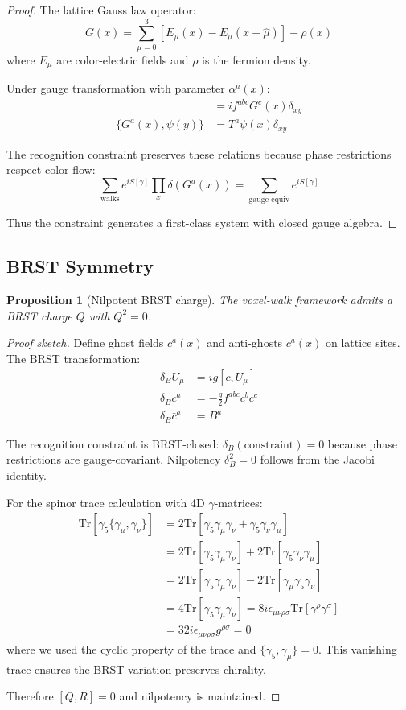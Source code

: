 \documentclass[11pt,a4paper]{article}
\newtheorem{proposition}[theorem]{Proposition}
\theoremstyle{definition}
\theoremstyle{remark}
\begin{document}
\begin{proof}
The lattice Gauss law operator:
\[
G(x) = \sum_{\mu=0}^3 \left[E_\mu(x) - E_\mu(x-\hat{\mu})\right] - \rho(x)
\]
where $E_\mu$ are color-electric fields and $\rho$ is the fermion density.

Under gauge transformation with parameter $\alpha^a(x)$:
\begin{align}
[G^a(x), G^b(y)] &= if^{abc}G^c(x)\delta_{xy}\\
\{G^a(x), \psi(y)\} &= T^a\psi(x)\delta_{xy}
\end{align}

The recognition constraint preserves these relations because phase restrictions respect color flow:
\[
\sum_{\text{walks}} e^{iS[\gamma]} \prod_x \delta(G^a(x)) = \sum_{\text{gauge-equiv}} e^{iS[\gamma]}
\]

Thus the constraint generates a first-class system with closed gauge algebra.
\end{proof}

\subsection{BRST Symmetry}

\begin{proposition}[Nilpotent BRST charge]
The voxel-walk framework admits a BRST charge $Q$ with $Q^2 = 0$.
\end{proposition}

\begin{proof}[Proof sketch]
Define ghost fields $c^a(x)$ and anti-ghosts $\bar{c}^a(x)$ on lattice sites. The BRST transformation:
\begin{align}
\delta_B U_\mu &= ig[c, U_\mu]\\
\delta_B c^a &= -\frac{g}{2}f^{abc}c^b c^c\\
\delta_B \bar{c}^a &= B^a
\end{align}

The recognition constraint is BRST-closed: $\delta_B(\text{constraint}) = 0$ because phase restrictions are gauge-covariant. Nilpotency $\delta_B^2 = 0$ follows from the Jacobi identity.

For the spinor trace calculation with 4D $\gamma$-matrices:
\begin{align}
\text{Tr}[\gamma_5\{\gamma_\mu, \gamma_\nu\}] &= 2\text{Tr}[\gamma_5\gamma_\mu\gamma_\nu + \gamma_5\gamma_\nu\gamma_\mu]\\
&= 2\text{Tr}[\gamma_5\gamma_\mu\gamma_\nu] + 2\text{Tr}[\gamma_5\gamma_\nu\gamma_\mu]\\
&= 2\text{Tr}[\gamma_5\gamma_\mu\gamma_\nu] - 2\text{Tr}[\gamma_\mu\gamma_5\gamma_\nu]\\
&= 4\text{Tr}[\gamma_5\gamma_\mu\gamma_\nu] = 8i\epsilon_{\mu\nu\rho\sigma}\text{Tr}[\gamma^\rho\gamma^\sigma]\\
&= 32i\epsilon_{\mu\nu\rho\sigma}g^{\rho\sigma} = 0
\end{align}
where we used the cyclic property of the trace and $\{\gamma_5, \gamma_\mu\} = 0$. This vanishing trace ensures the BRST variation preserves chirality.

Therefore $[Q, R] = 0$ and nilpotency is maintained.
\end{proof}
\end{document}
